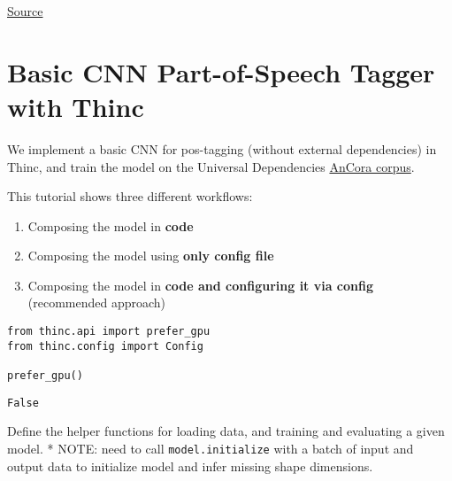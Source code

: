 \documentclass[
]{article}
\author{}
\date{}
\providecommand{\tightlist}{%
  \setlength{\itemsep}{0pt}\setlength{\parskip}{0pt}}
\begin{document}
\href{https://github.com/explosion/thinc/blob/master/examples/03_pos_tagger_basic_cnn.ipynb}{Source}

\hypertarget{basic-cnn-part-of-speech-tagger-with-thinc}{%
\section{Basic CNN Part-of-Speech Tagger with
Thinc}\label{basic-cnn-part-of-speech-tagger-with-thinc}}

We implement a basic CNN for pos-tagging (without external dependencies)
in Thinc, and train the model on the Universal Dependencies
\href{https://github.com/UniversalDependencies/UD_Spanish-AnCora}{AnCora
corpus}.

This tutorial shows three different workflows:

\begin{enumerate}
\def\labelenumi{\arabic{enumi}.}
\tightlist
\item
  Composing the model in \textbf{code}
\item
  Composing the model using \textbf{only config file}
\item
  Composing the model in \textbf{code and configuring it via config}
  (recommended approach)
\end{enumerate}

\begin{verbatim}
from thinc.api import prefer_gpu
from thinc.config import Config

prefer_gpu()
\end{verbatim}

\begin{verbatim}
False
\end{verbatim}

Define the helper functions for loading data, and training and
evaluating a given model. * NOTE: need to call
\texttt{model.initialize} with a batch of input and output
data to initialize model and infer missing shape dimensions.
\end{document}
